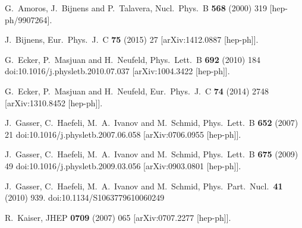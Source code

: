 \documentclass[12pt,a4paper]{article}
\begin{document}
\begin{thebibliography}{99}

  G.~Amoros, J.~Bijnens and P.~Talavera,
  Nucl.\ Phys.\ B {\bf 568} (2000) 319
  [hep-ph/9907264].

  J.~Bijnens,
  Eur.\ Phys.\ J.\ C {\bf 75} (2015)  27
  [arXiv:1412.0887 [hep-ph]].

  G.~Ecker, P.~Masjuan and H.~Neufeld,
  Phys.\ Lett.\ B {\bf 692} (2010) 184
  doi:10.1016/j.physletb.2010.07.037
  [arXiv:1004.3422 [hep-ph]].

  G.~Ecker, P.~Masjuan and H.~Neufeld,
  Eur.\ Phys.\ J.\ C {\bf 74} (2014) 2748
  [arXiv:1310.8452 [hep-ph]].

  J.~Gasser, C.~Haefeli, M.~A.~Ivanov and M.~Schmid,
  Phys.\ Lett.\ B {\bf 652} (2007) 21
  doi:10.1016/j.physletb.2007.06.058
  [arXiv:0706.0955 [hep-ph]].
 
  J.~Gasser, C.~Haefeli, M.~A.~Ivanov and M.~Schmid,
  Phys.\ Lett.\ B {\bf 675} (2009) 49
  doi:10.1016/j.physletb.2009.03.056
  [arXiv:0903.0801 [hep-ph]].
  
  J.~Gasser, C.~Haefeli, M.~A.~Ivanov and M.~Schmid,
  Phys.\ Part.\ Nucl.\  {\bf 41} (2010) 939.
  doi:10.1134/S1063779610060249

  R.~Kaiser,
  JHEP {\bf 0709} (2007) 065
  [arXiv:0707.2277 [hep-ph]].
  

\end{thebibliography}
\end{document}
